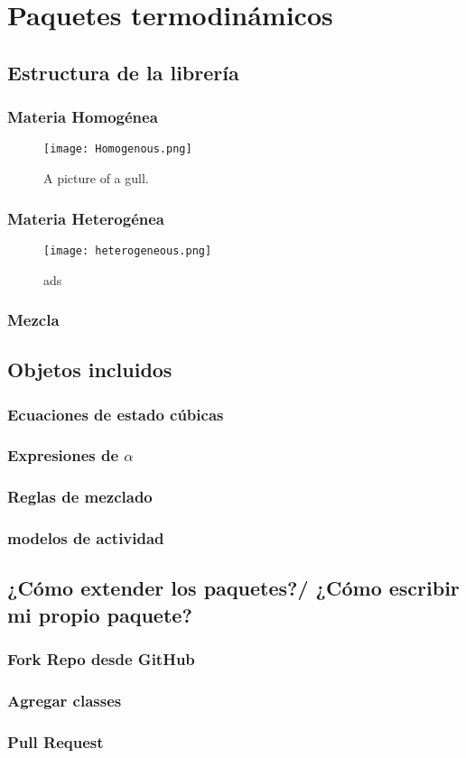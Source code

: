 \chapter{Paquetes termodinámicos}
	\section{Estructura de la librería}
	 \subsection{Materia Homogénea}

			\begin{figure}[!h]
			  
			  \centering
			    \texttt{[image: Homogenous.png]}
			    \caption{A picture of a gull.}
			\end{figure}

		\subsection{Materia Heterogénea}

			\begin{figure}[!h]
			  
			  \centering
			    \texttt{[image: heterogeneous.png]}
			    \caption{ads}
			\end{figure}


	
		\subsection{Mezcla}



	\section{Objetos incluidos}
		\subsection{Ecuaciones de estado cúbicas}
		\subsection{Expresiones de $\alpha$}
		\subsection{Reglas de mezclado}
		\subsection{modelos de actividad}
	\section{¿Cómo extender los paquetes?/ ¿Cómo escribir mi propio paquete?}
		\subsection{Fork Repo desde GitHub}
		\subsection{Agregar classes}
		\subsection{Pull Request}
